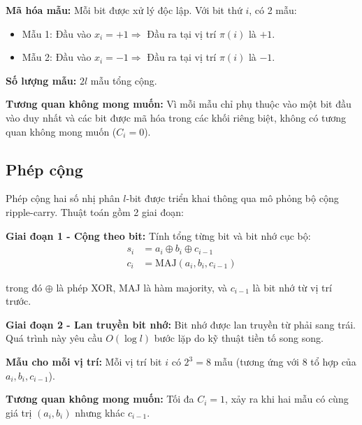 \vspace{0.2cm}

\textbf{Mã hóa mẫu:} Mỗi bit được xử lý độc lập. Với bit thứ $i$, có 2 mẫu:
\begin{itemize}
    \item Mẫu 1: Đầu vào $x_i = +1 \Rightarrow$ Đầu ra tại vị trí $\pi(i)$ là $+1$.
    \item Mẫu 2: Đầu vào $x_i = -1 \Rightarrow$ Đầu ra tại vị trí $\pi(i)$ là $-1$.
\end{itemize}

\textbf{Số lượng mẫu:} $2l$ mẫu tổng cộng.

\vspace{0.2cm}

\textbf{Tương quan không mong muốn:} Vì mỗi mẫu chỉ phụ thuộc vào một bit đầu vào duy nhất và các bit được mã hóa trong các khối riêng biệt, không có tương quan không mong muốn ($C_i = 0$).

\subsection{Phép cộng}

Phép cộng hai số nhị phân $l$-bit được triển khai thông qua mô phỏng bộ cộng ripple-carry. Thuật toán gồm 2 giai đoạn:

\vspace{0.2cm}

\textbf{Giai đoạn 1 - Cộng theo bit:} Tính tổng từng bit và bit nhớ cục bộ:
\begin{align}
    s_i &= a_i \oplus b_i \oplus c_{i-1} \\
    c_i &= \text{MAJ}(a_i, b_i, c_{i-1})
\end{align}

trong đó $\oplus$ là phép XOR, MAJ là hàm majority, và $c_{i-1}$ là bit nhớ từ vị trí trước.

\vspace{0.2cm}

\textbf{Giai đoạn 2 - Lan truyền bit nhớ:} Bit nhớ được lan truyền từ phải sang trái. Quá trình này yêu cầu $O(\log l)$ bước lặp do kỹ thuật tiền tố song song.

\vspace{0.2cm}

\textbf{Mẫu cho mỗi vị trí:} Mỗi vị trí bit $i$ có $2^3 = 8$ mẫu (tương ứng với 8 tổ hợp của $a_i, b_i, c_{i-1}$).

\vspace{0.2cm}

\textbf{Tương quan không mong muốn:} Tối đa $C_i = 1$, xảy ra khi hai mẫu có cùng giá trị $(a_i, b_i)$ nhưng khác $c_{i-1}$.

